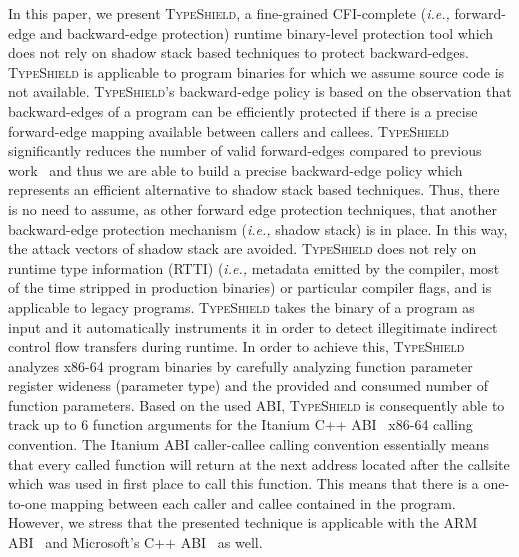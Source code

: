 In this paper, we present \textsc{TypeShield}, a fine-grained CFI-complete (\textit{i.e.,} forward-edge and backward-edge protection) runtime 
binary-level protection tool which does not rely on shadow stack based techniques to protect backward-edges. 
\textsc{TypeShield} is applicable to program binaries for which we assume source code is not available.
\textsc{TypeShield}'s backward-edge policy is based on the observation that backward-edges of a program can be efficiently protected
if there is a precise forward-edge mapping available between callers and callees.
\textsc{TypeShield} significantly reduces the number of valid forward-edges compared to previous work~\cite{veen:typearmor} and thus we are able 
to build a precise backward-edge policy which represents an efficient alternative to shadow stack based techniques.
Thus, there is no need to assume, as other forward edge protection techniques, that another backward-edge protection mechanism (\textit{i.e.,} shadow stack) is in place. In this way, the 
attack vectors of shadow stack are avoided.
\textsc{TypeShield} does not rely on runtime type information (RTTI) (\textit{i.e.,} metadata emitted by the compiler, most of the time stripped in production binaries) or particular compiler flags, and is applicable to legacy programs.
\textsc{TypeShield} takes the binary of a program as input and it automatically instruments it in order to detect illegitimate indirect control flow transfers during runtime. 
In order to achieve this, 
\textsc{TypeShield} analyzes x86-64 program binaries by carefully analyzing function parameter register wideness (parameter type) and the provided and consumed number of function parameters. 
Based on the used ABI, \textsc{TypeShield} is consequently able to track up to 6 function arguments for the Itanium C++ ABI~\cite{itanium:abi} x86-64 calling convention. 
The Itanium ABI caller-callee calling convention essentially means that every called function will return at the next address located after the callsite which was 
used in first place to call this function. This means that there is a one-to-one mapping between each caller and callee contained in the program.
However, we stress that the presented technique is applicable with the ARM ABI~\cite{arm:abi} and Microsoft's C++ ABI~\cite{microsoft:abi} 
as well.

